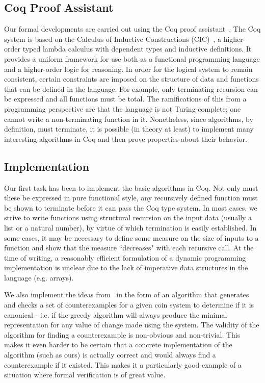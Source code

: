 \documentclass{acm_proc_article-sp}
\begin{document}
\subsection{Coq Proof Assistant}

Our formal developments are  carried out using the Coq proof assistant~\cite{coq12}. The Coq system is based on 
the Calculus of Inductive Constructions (CIC)~\cite{paulin93}, a higher-order typed lambda calculus with dependent types and inductive definitions. It provides a uniform framework for use  both as a functional programming language and a higher-order logic for reasoning. In order for the logical system to remain consistent, certain constraints are imposed on the structure of data  and functions that can be defined in the language. For example, only terminating recursion can be expressed and all functions must be total. The ramifications of this from a programming perspective are that the language is not Turing-complete; one cannot write a non-terminating function in it. Nonetheless, since algorithms, by definition, must terminate, it is possible (in theory at least) to implement many interesting algorithms in Coq and then prove properties about their behavior. 

\subsection{Implementation}

Our first task has been to implement the basic algorithms in Coq. Not only must these be expressed in pure functional style, any recursively defined function must be shown to terminate before it can pass the Coq type system. In most cases, we strive to write functions using structural recursion on the input data (usually a list or a natural number), by virtue of which termination is easily established. In some cases, it may be necessary to define some measure on the size of inputs to a function and show that the measure ``decreases" with each recursive call. At the time of writing, a reasonably efficient formulation of a dynamic programming implementation is unclear due to the lack of imperative data structures in the language (e.g. arrays).

We also implement the ideas from~\cite{pearson94} in the form of an algorithm that generates and checks a set of counterexamples for a given coin system to determine if it is canonical - i.e. if the greedy algorithm will always produce the minimal representation for any value of change made using the system. The validity of the algorithm for finding a counterexample is non-obvious and non-trivial. This makes it even harder to be certain that a concrete implementation of the algorithm (such as ours) is actually correct and would always find a counterexample if it existed. This makes it a particularly good example of a situation where formal verification is of great value. 
\end{document}
